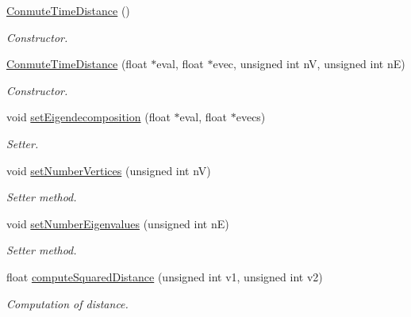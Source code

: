 \begin{DoxyCompactItemize}
\item 
\hyperlink{classHeatDiffusion_1_1Distance_1_1ConmuteTimeDistance_a433d9d6ef6156f0837677aae391eabb9}{Conmute\-Time\-Distance} ()
\begin{DoxyCompactList}\small\item\em Constructor. \end{DoxyCompactList}\item 
\hyperlink{classHeatDiffusion_1_1Distance_1_1ConmuteTimeDistance_ae403ede149a4754983eff5ee94c4dba7}{Conmute\-Time\-Distance} (float $\ast$eval, float $\ast$evec, unsigned int n\-V, unsigned int n\-E)
\begin{DoxyCompactList}\small\item\em Constructor. \end{DoxyCompactList}\item 
void \hyperlink{classHeatDiffusion_1_1Distance_1_1ConmuteTimeDistance_a6a7cfd79f3a1d7377211d1f24cbc2f80}{set\-Eigendecomposition} (float $\ast$eval, float $\ast$evecs)
\begin{DoxyCompactList}\small\item\em Setter. \end{DoxyCompactList}\item 
void \hyperlink{classHeatDiffusion_1_1Distance_1_1ConmuteTimeDistance_aab16b4e5157d12f470e02f8ad245e0a4}{set\-Number\-Vertices} (unsigned int n\-V)
\begin{DoxyCompactList}\small\item\em Setter method. \end{DoxyCompactList}\item 
void \hyperlink{classHeatDiffusion_1_1Distance_1_1ConmuteTimeDistance_a591153596c07a85617d30e7ddcd3c1cd}{set\-Number\-Eigenvalues} (unsigned int n\-E)
\begin{DoxyCompactList}\small\item\em Setter method. \end{DoxyCompactList}\item 
float \hyperlink{classHeatDiffusion_1_1Distance_1_1ConmuteTimeDistance_a4c3d012b2deb9db657229a31ba3663f3}{compute\-Squared\-Distance} (unsigned int v1, unsigned int v2)
\begin{DoxyCompactList}\small\item\em Computation of distance. \end{DoxyCompactList}\end{DoxyCompactItemize}
